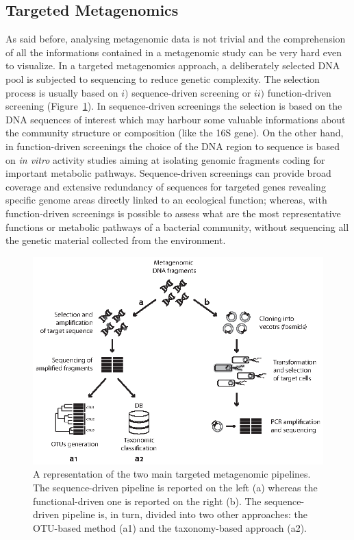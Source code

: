\subsection{Targeted Metagenomics \label{par:tarmet}}
As said before, analysing metagenomic data is not trivial and the comprehension of all the informations contained in a metagenomic study can be very hard even to visualize. In a targeted metagenomics approach, a deliberately selected DNA pool is subjected to sequencing to reduce genetic complexity. The selection process is usually based on $i)$ sequence-driven screening or $ii)$ function-driven screening (Figure~\ref{fig:tarpipe}). In sequence-driven screenings the selection is based on the DNA sequences of interest which may harbour some valuable informations about the community structure or composition (like the 16S gene). On the other hand, in function-driven screenings the choice of the DNA region to sequence is based on \textit{in vitro} activity studies aiming at isolating genomic fragments coding for important metabolic pathways. Sequence-driven screenings can provide broad coverage and extensive redundancy of sequences for targeted genes revealing specific genome areas directly linked to an ecological function; whereas, with function-driven screenings is possible to assess what are the most representative functions or metabolic pathways of a bacterial community, without sequencing all the genetic material collected from the environment.\\
\begin{figure}[!tb]
	\centering
	\includegraphics[width=1\textwidth]{./figures/Introduction/targeted_pipeline}
  	\caption{A representation of the two main targeted metagenomic pipelines. The sequence-driven pipeline is reported on the left (a) whereas the functional-driven one is reported on the right (b). The sequence-driven pipeline is, in turn, divided into two other approaches: the OTU-based method (a1) and the taxonomy-based approach (a2).\label{fig:tarpipe}}
\end{figure}

